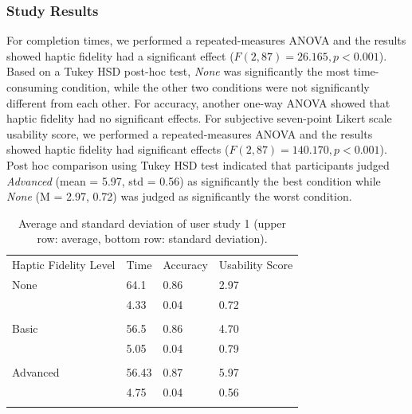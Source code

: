 \documentclass{svjour3}                     %
\begin{document}
\subsubsection{Study Results}

For completion times, we performed a repeated-measures ANOVA and the results showed haptic fidelity had a significant effect ($F(2, 87) = 26.165, p < 0.001$).
%
Based on a Tukey HSD post-hoc test, \textit{None} was significantly the most time-consuming condition, while the other two conditions were not significantly different from each other.
For accuracy, another one-way ANOVA showed that haptic fidelity had no significant effects.
For subjective seven-point Likert scale usability score, we performed a repeated-measures ANOVA and the results showed haptic fidelity had significant effects ($F(2, 87) = 140.170, p < 0.001$).
%
Post hoc comparison using Tukey HSD test indicated that participants judged \textit{Advanced} (mean = 5.97, std = 0.56) as significantly the best condition while \textit{None} (M = 2.97, 0.72) was judged as significantly the worst condition.

\begin{table}
\caption{Average and standard deviation of user study 1 (upper row: average, bottom row: standard deviation).}
\label{tab:r1}       %
\begin{tabular}{llll}
\hline\noalign{\smallskip}
Haptic Fidelity Level & Time & Accuracy & Usability Score\\
\noalign{\smallskip}\hline\noalign{\smallskip}
None & 64.1 & 0.86 & 2.97 \\
 & 4.33 & 0.04 & 0.72 \\\\
Basic & 56.5 & 0.86 & 4.70 \\
 & 5.05 & 0.04 & 0.79 \\\\
Advanced & 56.43 & 0.87 & 5.97 \\
 & 4.75 & 0.04 & 0.56 \\
\noalign{\smallskip}\hline
\end{tabular}
\end{table}
\end{document}
